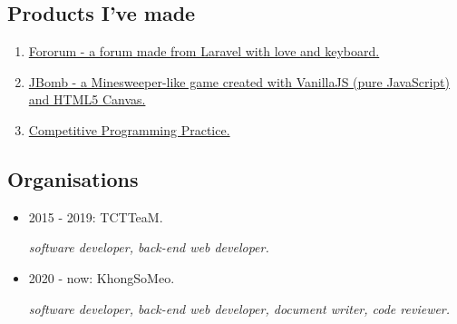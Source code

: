 \documentclass{article}
\begin{document}
        \subsection{Products I've made}
            \begin{enumerate}
                \item \href{https://github.com/trhgquan/Fororum}{Fororum - a forum made from Laravel with love and keyboard.}
                \item \href{https://github.com/trhgquan/JBomb}{JBomb - a Minesweeper-like game created with VanillaJS (pure JavaScript) and HTML5 Canvas.}
                \item \href{https://github.com/trhgquan/CPP}{Competitive Programming Practice.}
            \end{enumerate}

        \subsection{Organisations}
            \begin{itemize}
                \item 2015 - 2019: TCTTeaM.

                \emph{software developer, back-end web developer.}

                \item 2020 - now: KhongSoMeo.

                \emph{software developer, back-end web developer, document writer, code reviewer.}
            \end{itemize}
\end{document}
